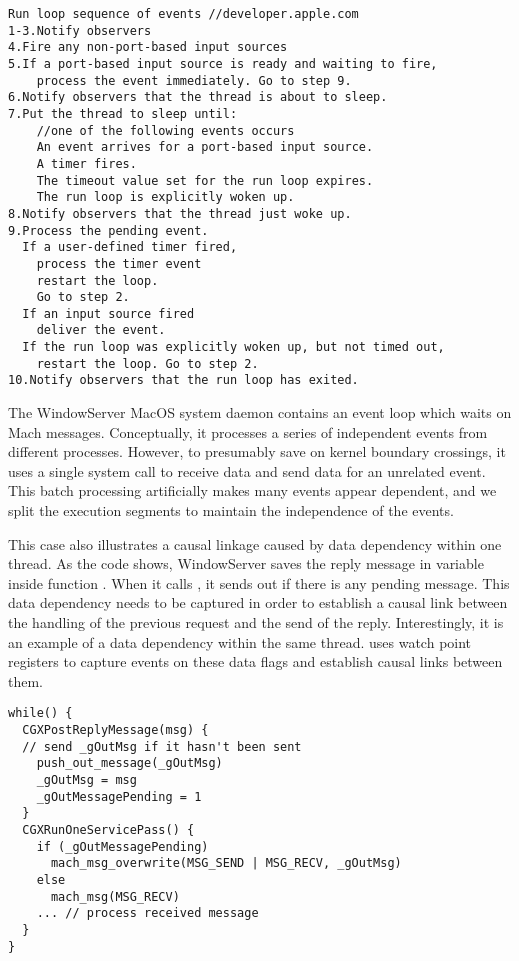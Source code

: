 {\footnotesize \begin{verbatim}
Run loop sequence of events //developer.apple.com
1-3.Notify observers
4.Fire any non-port-based input sources
5.If a port-based input source is ready and waiting to fire,
    process the event immediately. Go to step 9.
6.Notify observers that the thread is about to sleep.
7.Put the thread to sleep until:
    //one of the following events occurs
    An event arrives for a port-based input source.
    A timer fires.
    The timeout value set for the run loop expires.
    The run loop is explicitly woken up.
8.Notify observers that the thread just woke up.
9.Process the pending event.
  If a user-defined timer fired,
    process the timer event
    restart the loop.
    Go to step 2.
  If an input source fired
    deliver the event.
  If the run loop was explicitly woken up, but not timed out,
    restart the loop. Go to step 2.
10.Notify observers that the run loop has exited.

\end{verbatim}
}

The WindowServer MacOS system daemon contains an event loop which waits on Mach
messages. Conceptually, it processes a series of independent events from
different processes. However, to presumably save on kernel boundary crossings,
it uses a single system call to receive data and send data for an unrelated
event. This batch processing artificially makes many events appear dependent,
and we split the execution segments to maintain the independence of the events.

This case also illustrates a causal linkage caused by data dependency within
one thread.  As the code shows, WindowServer saves the reply message in
variable  inside function .  When it calls
, it sends out  if there is any pending
message.  This data dependency needs to be captured in order to establish a
causal link between the handling of the previous request and the send of the
reply.  Interestingly, it is an example of a data dependency within the same
thread.  \xxx uses watch point registers to capture events on these data flags
and establish causal links between them.

{\footnotesize \begin{verbatim}
while() {
  CGXPostReplyMessage(msg) {
  // send _gOutMsg if it hasn't been sent
    push_out_message(_gOutMsg)
    _gOutMsg = msg
    _gOutMessagePending = 1
  }
  CGXRunOneServicePass() {
    if (_gOutMessagePending)
      mach_msg_overwrite(MSG_SEND | MSG_RECV, _gOutMsg)
    else
      mach_msg(MSG_RECV)
    ... // process received message
  }
}
\end{verbatim}
}


